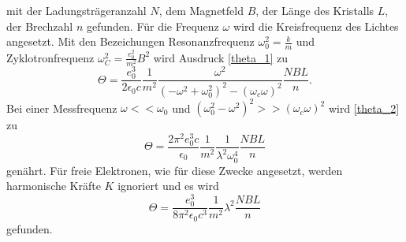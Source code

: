 mit der Ladungsträgeranzahl $N$, dem Magnetfeld $B$, der Länge des Kristalls $L$, der Brechzahl $n$ gefunden.
Für die Frequenz $\omega$ wird die Kreisfrequenz des Lichtes angesetzt.
Mit den Bezeichungen Resonanzfrequenz $\omega_0^2 =\frac{k}{m}$ und Zyklotronfrequenz $\omega_C^2 =\frac{e_0^2}{m^2} B^2$ wird Ausdruck \eqref{theta_1} zu
\begin{equation}
    \Theta = \frac{e_0^3}{2\epsilon_0 c}\frac{1}{m^2} \frac{\omega^2}{(-\omega^2+\omega_0^2)^2-(\omega_c\omega)^2} \frac{NBL}{n}.
    \label{theta_2}
\end{equation}
Bei einer Messfrequenz $\omega << \omega_0$ und $(\omega_0^2-\omega^2)^2>>(\omega_c\omega)^2$ wird \eqref{theta_2} zu
\begin{equation}
    \Theta = \frac{2\pi^2 e_0^3 c}{\epsilon_0} \frac{1}{m^2} \frac{1}{\lambda^2\omega_0^4} \frac{NBL}{n}
\end{equation}
genährt.
Für freie Elektronen, wie für diese Zwecke angesetzt, werden harmonische Kräfte $K$ ignoriert und es wird
\begin{equation}
    \Theta = \frac{e_0^3}{8\pi^2\epsilon_0 c^3} \frac{1}{m^2} \lambda^2 \frac{NBL}{n}
	\label{eqn:formel}
\end{equation}
gefunden.
